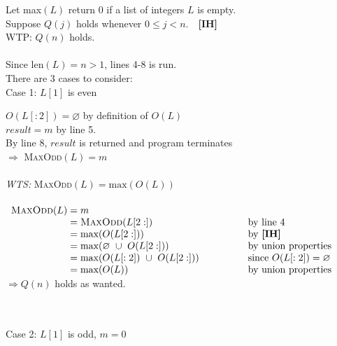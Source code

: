 \documentclass[12pt]{article}
\begin{document}
\hfill\begin{minipage}{\dimexpr\textwidth-10mm}
	Let max$(L)$ return 0 if a list of integers $L$ is empty.\\
	Suppose $Q(j)$ holds whenever $0 \leq j < n$. \qquad \qquad \qquad \,\,\,\,\textbf{[IH]}\\
	WTP: $Q(n)$ holds.
	\\\\
	Since $\text{len}(L) = n > 1$, lines 4-8 is run.\\
	There are 3 cases to consider:\\
	Case 1: $L[1]$ is even
	\vspace*{1mm}

	\hfill\begin{minipage}{\dimexpr\textwidth-10mm} %
		$O(L[:2]) = \varnothing$  by definition of $O(L)$\\
		$result = m$ by line 5.\\
		By line 8, $result$ is returned and program terminates\\
		$\Longrightarrow$  \textsc{MaxOdd}$(L) = m$
		\\\\
		\emph{WTS:} \textsc{MaxOdd}$(L) = \text{max}(O(L))$
		\\\\
		$\begin{array}{l@{}>{\displaystyle}ll}
				\text{\textsc{MaxOdd}}(L) & {}=  m                                                    &                                       \\
				                          & {}=  \text{\textsc{MaxOdd}}(L[2:])                        & \text{by line 4}                      \\
				                          & {}=  \text{max}(O(L[2:]))                                 & \text{by \textbf{[IH]}}               \\%
				                          & {}=  \text{max}(\varnothing \ \cup \ O(L[2:]))            & \text{by union properties}            \\
				                          & {}=  \text{max}(O(L[:2]) \ \cup \ O(L[2:])) \qquad \qquad & \text{since $O(L[:2]) = \varnothing$} \\
				                          & {}=  \text{max}(O(L))                                     & \text{by union properties}            \\
			\end{array}$
		$\Longrightarrow Q(n)$ holds as wanted.\\
	\end{minipage}
	\\\\
	Case 2: $L[1]$ is odd, $m = 0$
	\vspace*{1mm}


\end{minipage}
\end{document}
